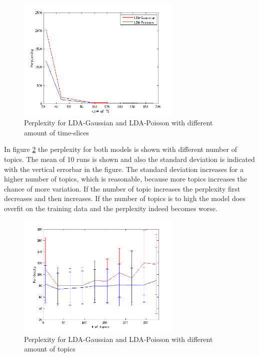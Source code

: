 \begin{figure}[h!]
 \centering
  \includegraphics[width=0.7\textwidth]{Pictures/CompareTSgausPois.png}
  \caption{Perplexity for LDA-Gaussian and LDA-Poisson with different amount of time-slices}
  \label{fig:CompareTS}
\end{figure}

In figure \ref{fig:CompareK} the perplexity for both models is shown with different number of topics. The mean of 10 runs is shown and also the standard deviation is indicated with the vertical errorbar in the figure. The standard deviation increases for a higher number of topics, which is reasonable, because more topics increases the chance of more variation. If the number of topic increases the perplexity first decreases and then increases. If the number of topics is to high the model does overfit on the training data and the perplexity indeed becomes worse.\\




 \begin{figure}[h!]
  \centering
  \includegraphics[width=0.7\textwidth]{Pictures/CompareCrossTops.png}
\caption{Perplexity for LDA-Gaussian and LDA-Poisson with different amount of topics}
  \label{fig:CompareK}
 \end{figure}


